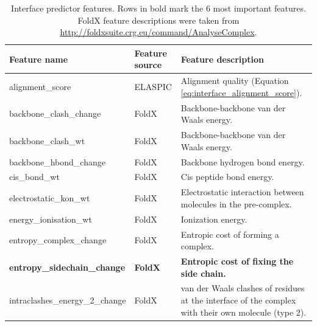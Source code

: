 \begin{table}[tb]
	\centering
	\caption[Features selected for the interface predictor.]{
		Interface predictor features.
		Rows in bold mark the 6 most important features.
		FoldX feature descriptions were taken from \url{http://foldxsuite.crg.eu/command/AnalyseComplex}.
	}
	\label{tab:interface_features}
	\begin{tabular}{ l | l | p{8cm} }
		\toprule
		Feature name                          & Feature source   & Feature description                                                                                        \\
		\midrule
		alignment\_score                      & ELASPIC          & Alignment quality (Equation \ref{eq:interface_alignment_score}).                                           \\
		backbone\_clash\_change               & FoldX            & Backbone-backbone van der Waals energy.                                                                    \\
		backbone\_clash\_wt                   & FoldX            & Backbone-backbone van der Waals energy.                                                                    \\
		backbone\_hbond\_change               & FoldX            & Backbone hydrogen bond energy.                                                                             \\
		cis\_bond\_wt                         & FoldX            & Cis peptide bond energy.                                                                                   \\
		electrostatic\_kon\_wt                & FoldX            & Electrostatic interaction between molecules in the pre-complex.                                            \\
		energy\_ionisation\_wt                & FoldX            & Ionization energy.                                                                                         \\
		entropy\_complex\_change              & FoldX            & Entropic cost of forming a complex.                                                                        \\
		\textbf{entropy\_sidechain\_change}   & \textbf{FoldX}   & \textbf{Entropic cost of fixing the side chain.}                                                           \\
		intraclashes\_energy\_2\_change       & FoldX            & van der Waals clashes of residues at the interface of the complex with their own molecule (type 2).        \\

\end{tabular}
\end{table}
